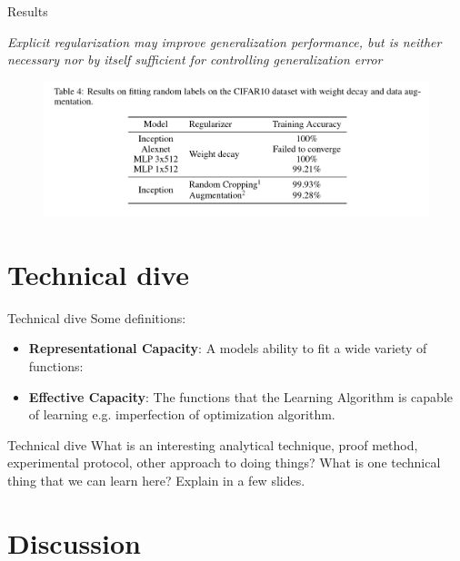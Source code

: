 \documentclass[10pt]{beamer}
\begin{document}
\begin{frame}[fragile]{Results}
	\begin{center}
			\emph{Explicit regularization may improve generalization performance, but is neither necessary nor by itself sufficient for controlling generalization error}
	\end{center}

	\begin{figure}
		\centering
		\centering
		\includegraphics[width=\linewidth]{fig2c}
		\label{fig:withreg}
	\end{figure}
\end{frame}

\section{Technical dive}

\begin{frame}[fragile]{Technical dive }
	Some definitions:
	\begin{itemize}
		\item \textbf{Representational Capacity}: A models ability to fit a wide variety of functions:
		\item \textbf{Effective Capacity}: The functions that the Learning Algorithm is capable of learning e.g. imperfection of optimization algorithm.
	\end{itemize}
\end{frame}	

\begin{frame}[fragile]{Technical dive }
	What is an interesting analytical technique, proof method, experimental protocol, other approach to doing things? What is one technical thing that we can learn here? Explain in a few slides.
\end{frame}	

\section{Discussion}
\end{document}
